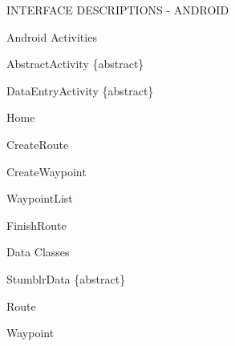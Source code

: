 \documentclass{article}
\begin{document}
	\begin{section}{INTERFACE DESCRIPTIONS - ANDROID}
		\begin{subsection}{Android Activities}
			\begin{subsubsection}{AbstractActivity \{abstract\}}
				
			\end{subsubsection}
		
			\clearpage
			\begin{subsubsection}{DataEntryActivity \{abstract\}}
				
			\end{subsubsection}
		
			\begin{subsubsection}{Home}
				
			\end{subsubsection}
		
			\clearpage
			\begin{subsubsection}{CreateRoute}
				
			\end{subsubsection}
		
			\clearpage
			\begin{subsubsection}{CreateWaypoint}
				
			\end{subsubsection}
		
			\clearpage
			\begin{subsubsection}{WaypointList}
				
			\end{subsubsection}
		
			\clearpage
			\begin{subsubsection}{FinishRoute}
				
			\end{subsubsection}
		\end{subsection}
		
		\clearpage
		\begin{subsection}{Data Classes}
			\begin{subsubsection}{StumblrData \{abstract\}}
				
			\end{subsubsection}
		
			\clearpage
			\begin{subsubsection}{Route}
				
			\end{subsubsection}
		
			\clearpage
			\begin{subsubsection}{Waypoint}
				
			\end{subsubsection}
		\end{subsection}
	\end{section}
	
\end{document}
